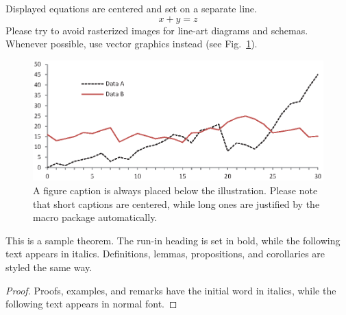 \documentclass[runningheads]{llncs}
\begin{document}
\noindent Displayed equations are centered and set on a separate
line.
\begin{equation}
x + y = z
\end{equation}
Please try to avoid rasterized images for line-art diagrams and
schemas. Whenever possible, use vector graphics instead (see
Fig.~\ref{fig1}).

\begin{figure}
\includegraphics[width=\textwidth]{fig1.eps}
\caption{A figure caption is always placed below the illustration.
Please note that short captions are centered, while long ones are
justified by the macro package automatically.} \label{fig1}
\end{figure}

\begin{theorem}
This is a sample theorem. The run-in heading is set in bold, while
the following text appears in italics. Definitions, lemmas,
propositions, and corollaries are styled the same way.
\end{theorem}
%
%
\begin{proof}
Proofs, examples, and remarks have the initial word in italics,
while the following text appears in normal font.
\end{proof}

%
%



\end{document}
